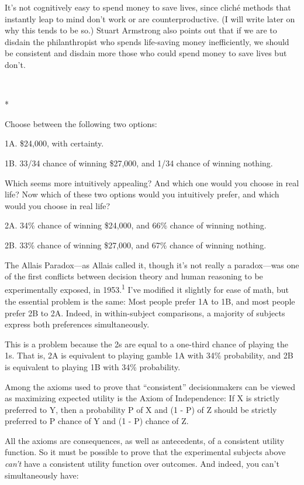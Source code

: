 {
 It's not cognitively easy to spend money to save
lives, since cliché methods that instantly leap to mind
don't work or are counterproductive. (I will write
later on why this tends to be so.) Stuart Armstrong also points out
that if we are to disdain the philanthropist who spends life-saving
money inefficiently, we should be consistent and disdain more those who
could spend money to save lives but don't.}

{\centering
 \ ~
\par}

{\centering
 *
\par}


{
 Choose between the following two options:}

{
 1A. \$24,000, with certainty.}

{
 1B. 33/34 chance of winning \$27,000, and 1/34 chance of winning
nothing.}

{
 Which seems more intuitively appealing? And which one would you
choose in real life? Now which of these two options would you
intuitively prefer, and which would you choose in real life?}

{
 2A. 34\% chance of winning \$24,000, and 66\% chance of winning
nothing.}

{
 2B. 33\% chance of winning \$27,000, and 67\% chance of winning
nothing.}

{
 The Allais Paradox---as Allais called it, though
it's not really a paradox---was one of the first
conflicts between decision theory and human reasoning to be
experimentally exposed, in 1953.\textsuperscript{1}
I've modified it slightly for ease of math, but the
essential problem is the same: Most people prefer 1A to 1B, and most
people prefer 2B to 2A. Indeed, in within-subject comparisons, a
majority of subjects express both preferences simultaneously.}

{
 This is a problem because the 2s are equal to a one-third chance
of playing the 1s. That is, 2A is equivalent to playing gamble 1A with
34\% probability, and 2B is equivalent to playing 1B with 34\%
probability.}

{
 Among the axioms used to prove that
``consistent'' decisionmakers can be
viewed as maximizing expected utility is the Axiom of Independence: If
X is strictly preferred to Y, then a probability P of X and (1 - P) of
Z should be strictly preferred to P chance of Y and (1 - P) chance of
Z.}

{
 All the axioms are consequences, as well as antecedents, of a
consistent utility function. So it must be possible to prove that the
experimental subjects above \textit{can't} have a
consistent utility function over outcomes. And indeed, you
can't simultaneously have:}

